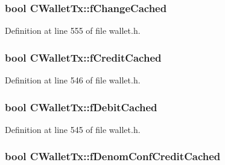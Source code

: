 \subsubsection[{f\+Change\+Cached}]{\setlength{\rightskip}{0pt plus 5cm}bool C\+Wallet\+Tx\+::f\+Change\+Cached\hspace{0.3cm}{\ttfamily [mutable]}}\label{class_c_wallet_tx_ab436a962e5e32d392928bc68af968bf1}


Definition at line 555 of file wallet.\+h.

\hypertarget{class_c_wallet_tx_ad896ca73e00251f900185a1114c3c506}{}
\subsubsection[{f\+Credit\+Cached}]{\setlength{\rightskip}{0pt plus 5cm}bool C\+Wallet\+Tx\+::f\+Credit\+Cached\hspace{0.3cm}{\ttfamily [mutable]}}\label{class_c_wallet_tx_ad896ca73e00251f900185a1114c3c506}


Definition at line 546 of file wallet.\+h.

\hypertarget{class_c_wallet_tx_ad2dca68c99f2e677e5999c9872a269da}{}
\subsubsection[{f\+Debit\+Cached}]{\setlength{\rightskip}{0pt plus 5cm}bool C\+Wallet\+Tx\+::f\+Debit\+Cached\hspace{0.3cm}{\ttfamily [mutable]}}\label{class_c_wallet_tx_ad2dca68c99f2e677e5999c9872a269da}


Definition at line 545 of file wallet.\+h.

\hypertarget{class_c_wallet_tx_a73a6308df83f13853a1891ef67c2d199}{}
\subsubsection[{f\+Denom\+Conf\+Credit\+Cached}]{\setlength{\rightskip}{0pt plus 5cm}bool C\+Wallet\+Tx\+::f\+Denom\+Conf\+Credit\+Cached\hspace{0.3cm}{\ttfamily [mutable]}}\label{class_c_wallet_tx_a73a6308df83f13853a1891ef67c2d199}



